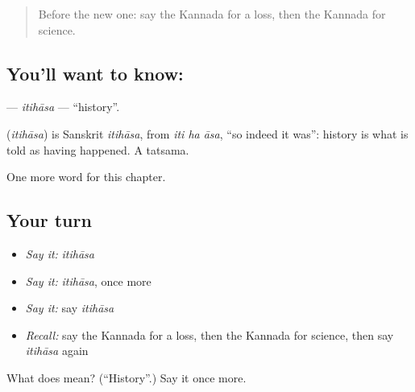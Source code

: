 \begin{quote}
Before the new one: say the Kannada for a loss, then the Kannada for science.
\end{quote}

\subsection*{You'll want to know: }
\textbf{} — \emph{itihāsa} — \textquotedblleft{}history\textquotedblright{}.

\begin{cousinweb}
\textbf{} (\emph{itihāsa}) is Sanskrit \emph{itihāsa}, from \emph{iti ha āsa}, \textquotedblleft{}so indeed it was\textquotedblright{}: history is what is told as having happened. A tatsama.
\end{cousinweb}

\begin{grammarlens}[title={What you've built}]
One more word for this chapter.
\end{grammarlens}

\subsection*{Your turn}
\begin{itemize}
\raggedright
  \item \emph{Say it:} \emph{itihāsa}
  \item \emph{Say it:} \emph{itihāsa}, once more
  \item \emph{Say it:} say \emph{itihāsa}
  \item \emph{Recall:} say the Kannada for a loss, then the Kannada for science, then say \emph{itihāsa} again
\end{itemize}

\begin{tcolorbox}[breakable,colback=teal!4,colframe=teal!35!black,title={Before you move on}]
What does  mean? (\textquotedblleft{}History\textquotedblright{}.) Say it once more.
\end{tcolorbox}
